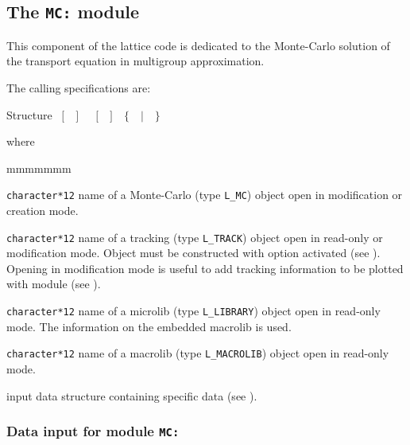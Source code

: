\subsection{The {\tt MC:} module}\label{sect:MCData}

This component of the lattice code is dedicated to the Monte-Carlo solution of the transport
equation in multigroup approximation.

\vskip 0.02cm

The calling specifications are:

\begin{DataStructure}{Structure }
~$[$~~$]$~\moc{:=}~~$[$~~$]$~~$\{$~~$|$~~$\}$~\moc{::}~ \\
\end{DataStructure}

\noindent where
\begin{ListeDeDescription}{mmmmmmm}

\item[\dusa{OUTMC}] {\tt character*12} name of a {\sc Monte-Carlo} (type {\tt L\_MC}) object open in modification or creation
mode.

\item[\dusa{TRACK}] {\tt character*12} name of a  {\sc tracking} (type {\tt L\_TRACK}) object open in
read-only or modification mode. Object  must be constructed with option  activated (see ). Opening 
in modification mode is useful to add tracking information to be plotted with module  (see ).

\item[\dusa{MICRO}] {\tt character*12} name of a {\sc microlib} (type {\tt L\_LIBRARY}) object open in read-only mode. The information on
the embedded macrolib is used.

\item[\dusa{MACRO}] {\tt character*12} name of a {\sc macrolib} (type {\tt L\_MACROLIB}) object open in read-only mode.

\item[\dusa{MC\_data}] input data structure containing specific data (see ).

\end{ListeDeDescription}

\subsubsection{Data input for module {\tt MC:}}\label{sect:descMC}

